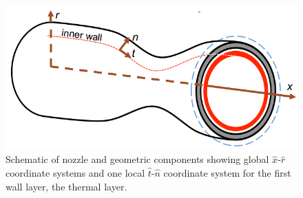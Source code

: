 \documentclass{article}
\begin{document}
\begin{figure}
\caption{Schematic of nozzle and geometric components showing global $\hat{x}$-$\hat{r}$ coordinate systems and one local $\hat{t}$-$\hat{n}$ coordinate system for the first wall layer, the thermal layer.}
\label{fig:nozzleSchematic}
\begin{center}
\includegraphics[scale=0.5]{figs/nozzle_schematic.png}
\end{center}
\end{figure}
\end{document}
